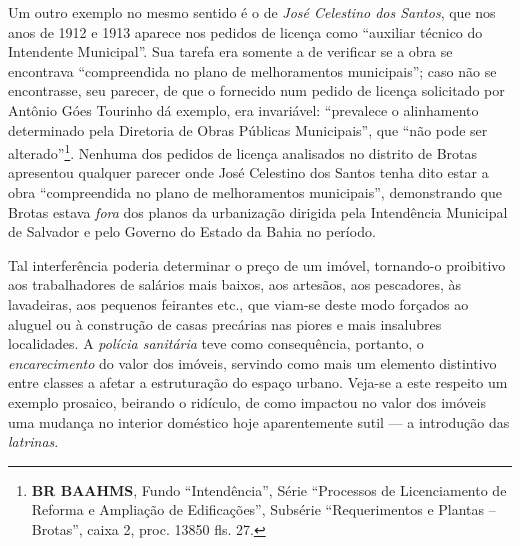Um outro exemplo no mesmo sentido é o de \textit{José Celestino dos Santos}, que nos anos de 1912 e 1913 aparece nos pedidos de licença como ``auxiliar técnico do Intendente Municipal''. Sua tarefa era somente a de verificar se a obra se encontrava ``compreendida no plano de melhoramentos municipais''; caso não se encontrasse, seu parecer, de que o fornecido num pedido de licença solicitado por Antônio Góes Tourinho dá exemplo, era invariável: ``prevalece o  alinhamento determinado pela Diretoria de Obras Públicas Municipais'', que ``não pode ser alterado''\footnote{\textbf{BR BAAHMS}, Fundo ``Intendência'', Série ``Processos de Licenciamento de Reforma e Ampliação de Edificações'', Subsérie ``Requerimentos e Plantas – Brotas'', caixa 2, proc. 13850 fls. 27.}. Nenhuma dos pedidos de licença analisados no distrito de Brotas apresentou qualquer parecer onde José Celestino dos Santos tenha dito estar a obra ``compreendida no plano de melhoramentos municipais'', demonstrando que Brotas estava \textit{fora} dos planos da urbanização dirigida pela Intendência Municipal de Salvador e pelo Governo do Estado da Bahia no período.

Tal interferência poderia determinar o preço de um imóvel, tornando-o proibitivo aos trabalhadores de salários mais baixos, aos artesãos, aos pescadores, às lavadeiras, aos pequenos feirantes etc., que viam-se deste modo forçados ao aluguel ou à construção de casas precárias nas piores e mais insalubres localidades. A \textit{polícia sanitária} teve como consequência, portanto, o \textit{encarecimento} do valor dos imóveis, servindo como mais um elemento distintivo entre classes a afetar a estruturação do espaço urbano. Veja-se a este respeito um exemplo prosaico, beirando o ridículo, de como impactou no valor dos imóveis uma mudança no interior doméstico hoje aparentemente sutil --- a introdução das \textit{latrinas}. 

